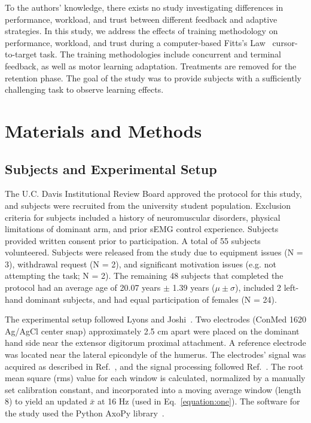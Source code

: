 To the authors' knowledge, there exists no study investigating differences in performance, workload, and trust between different feedback and adaptive strategies.
In this study, we address the effects of training methodology on performance, workload, and trust during a computer-based Fitts's Law~\cite{RN43} cursor-to-target task.
The training methodologies include concurrent and terminal feedback, as well as motor learning adaptation.
Treatments are removed for the retention phase.
The goal of the study was to provide subjects with a sufficiently challenging task to observe learning effects.

\section{Materials and Methods}
\subsection{Subjects and Experimental Setup}

The U.C. Davis Institutional Review Board approved the protocol for this study, and subjects were recruited from the university student population.
Exclusion criteria for subjects included a history of neuromuscular disorders, physical limitations of dominant arm, and prior sEMG control experience.
Subjects provided written consent prior to participation.
A total of 55 subjects volunteered.
Subjects were released from the study due to equipment issues (N = 3), withdrawal request (N = 2), and significant motivation issues (e.g. not attempting the task; N = 2).
The remaining 48 subjects that completed the protocol had an average age of 20.07 years $\pm$ 1.39 years ($\mu\pm\sigma$), included 2 left-hand dominant subjects, and had equal participation of females (N = 24).

The experimental setup followed Lyons and Joshi~\cite{RN44}.
Two electrodes (ConMed 1620 Ag/AgCl center snap) approximately 2.5 cm apart were placed on the dominant hand side near the extensor digitorum proximal attachment.
A reference electrode was located near the lateral epicondyle of the humerus.
The electrodes' signal was acquired as described in Ref.~\cite{RN44}, and the signal processing followed Ref.~\cite{RN45}.
The root mean square (rms) value for each window is calculated, normalized by a manually set calibration constant, and incorporated into a moving average window (length 8) to yield an updated $\bar{x}$ at 16 Hz (used in Eq.~\ref{equation:one}).
The software for the study used the Python AxoPy library~\cite{RN46}.

